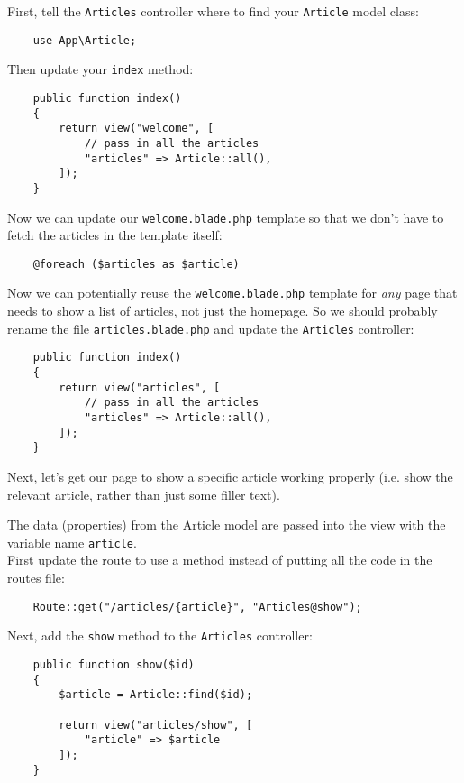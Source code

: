 First, tell the \texttt{Articles} controller where to find your \texttt{Article} model class:

\begin{verbatim}
    use App\Article;
\end{verbatim}

Then update your \texttt{index} method:

\begin{verbatim}
    public function index()
    {
        return view("welcome", [
            // pass in all the articles
            "articles" => Article::all(),
        ]);
    }
\end{verbatim}

Now we can update our \texttt{welcome.blade.php} template so that we don't have to fetch the articles in the template itself:

\begin{verbatim}
    @foreach ($articles as $article)
\end{verbatim}

Now we can potentially reuse the \texttt{welcome.blade.php} template for \textit{any} page that needs to show a list of articles, not just the homepage. So we should probably rename the file \texttt{articles.blade.php} and update the \texttt{Articles} controller:

\begin{verbatim}
    public function index()
    {
        return view("articles", [
            // pass in all the articles
            "articles" => Article::all(),
        ]);
    }
\end{verbatim}

Next, let's get our page to show a specific article working properly (i.e. show the relevant article, rather than just some filler text).


The data (properties) from the Article model are passed into the view with the variable name \texttt{article}.
\\

First update the route to use a method instead of putting all the code in the routes file:

\begin{verbatim}
    Route::get("/articles/{article}", "Articles@show");
\end{verbatim}

Next, add the \texttt{show} method to the \texttt{Articles} controller:

\begin{verbatim}
    public function show($id)
    {
        $article = Article::find($id);

        return view("articles/show", [
            "article" => $article
        ]);
    }
\end{verbatim}


